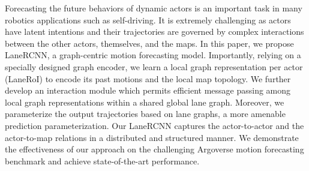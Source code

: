 Forecasting the future behaviors of dynamic actors is an important task in many robotics
applications such as self-driving.  
It is extremely challenging as actors have latent intentions 
and their trajectories are governed by complex interactions between the other actors,
themselves, and the maps.
In this paper, we propose LaneRCNN, 
a graph-centric motion forecasting model.
Importantly, relying on a specially designed graph encoder, we learn a local
graph representation per actor (LaneRoI) to encode its past motions and the local map topology.
We further develop an interaction module which permits efficient message
passing among local graph representations within a shared global lane graph.
Moreover, we parameterize the output trajectories based on lane graphs, a more amenable prediction parameterization.
Our LaneRCNN captures the actor-to-actor and the actor-to-map relations in a
distributed and structured manner.
We demonstrate the effectiveness of our approach on the challenging Argoverse motion
forecasting benchmark and achieve state-of-the-art performance.

